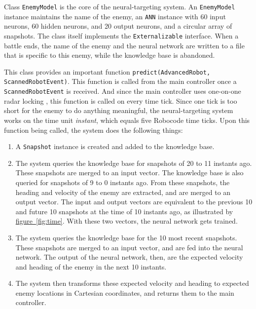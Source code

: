 \documentclass[11pt,a4paper]{article}
\begin{document}
Class \texttt{EnemyModel} is the core of the neural-targeting system. An \texttt{EnemyModel} instance maintains the name of the enemy, an \texttt{ANN} instance with 60 input neurons, 60 hidden neurons, and 20 output neurons, and a circular array of snapshots. The class itself implements the \texttt{Externalizable} interface. When a battle ends, the name of the enemy and the neural network are written to a file that is specific to this enemy, while the knowledge base is abandoned.

This class provides an important function \texttt{predict({\small{AdvancedRobot, ScannedRobotEvent}})}. This function is called from the main controller once a \texttt{ScannedRobotEvent} is received. And since the main controller uses one-on-one radar locking \cite{radar_lock}, this function is called on every time tick. Since one tick is too short for the enemy to do anything meaningful, the neural-targeting system works on the time unit \emph{instant}, which equals five Robocode time ticks. Upon this function being called, the system does the following things:

\begin{enumerate}[itemsep=0mm]
\item A \texttt{Snapshot} instance is created and added to the knowledge base.
\item The system queries the knowledge base for snapshots of 20 to 11 instants ago. These snapshots are merged to an input vector. The knowledge base is also queried for snapshots of 9 to 0 instants ago. From these snapshots, the heading and velocity of the enemy are extracted, and are merged to an output vector. The input and output vectors are equivalent to the previous 10 and future 10 snapshots at the time of 10 instants ago, as illustrated by \hyperref[fig:time]{figure~\ref{fig:time}}. With these two vectors, the neural network gets trained.
\item The system queries the knowledge base for the 10 most recent snapshots. These snapshots are merged to an input vector, and are fed into the neural network. The output of the neural network, then, are the expected velocity and heading of the enemy in the next 10 instants.
\item The system then transforms these expected velocity and heading to expected enemy locations in Cartesian coordinates, and returns them to the main controller.
\end{enumerate}
\end{document}
